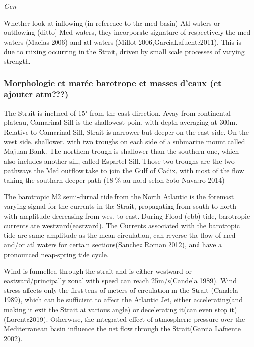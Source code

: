 \textit{Gen}

Whether look at inflowing (in reference to the med basin) Atl waters or outflowing (ditto) Med waters, they incorporate signature of respectively the med waters (Macias 2006) and atl waters (Millot 2006,GarciaLafuente2011). This is due to mixing occurring in the Strait, driven by small scale processes of varying strength. 


\subsubsection{Morphologie et marée barotrope et masses d'eaux (et ajouter atm???)}


The Strait is inclined of 15$^\text{o}$ from the east direction. Away from continental plateau, Camarinal Sill is the shallowest point with depth averaging at 300m. Relative to Camarinal Sill, Strait is narrower but deeper on the east side. On the west side, shallower, with two troughs on each side of a submarine mount called Majuan Bank. The northern trough is shallower than the southern one, which also includes another sill, called Espartel Sill. Those two troughs are the two pathways the Med outflow take to join the Gulf of Cadix, with most of the flow taking the southern deeper path (18 \% au nord selon Soto-Navarro 2014)


The barotropic M2 semi-durnal tide from the North Atlantic is the foremost varying signal for the currents in the Strait, propagating from south to north with amplitude decreasing from west to east\citep{candela_1990}. During Flood (ebb) tide, barotropic currents ate westward(eastward). The Currents associated with the barotropic tide are same amplitude as the mean circulation, can reverse the flow of med and/or atl waters for certain sections(Sanchez Roman 2012), and have a pronounced neap-spring tide cycle.

Wind is funnelled through the strait and is either westward or eastward/principally zonal with speed can reach 25m/s(Candela 1989). Wind stress affects only the first tens of meters of circulation in the Strait (Candela 1989), which can be sufficient to affect the Atlantic Jet, either accelerating(and making it exit the Strait at various angle) or decelerating it(can even stop it)(Lorente2019). Otherwise, the integrated effect of atmospheric pressure over the Mediterranean basin influence the net flow through the Strait(Garcia Lafuente 2002).





